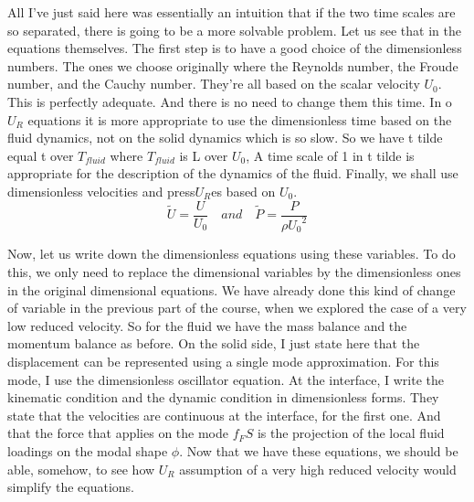 \documentclass{article}
\begin{document}
All I've just said here was essentially
an intuition that if the two time scales are so separated, there is
going to be a more solvable problem. Let us see that in
the equations themselves. The first step is to have a good
choice of the dimensionless numbers. The ones we choose originally
where the Reynolds number, the Froude number, and the Cauchy number. They're all based on
the scalar velocity $U_0$. This is perfectly adequate. And there is no need
to change them this time. 
In o$U_R$ equations it is more appropriate
to use the dimensionless time based on the fluid dynamics, not on
the solid dynamics which is so slow. So we have t tilde equal t over $T_{fluid}$ where $T_{fluid}$ is L over $U_0$,
A time scale of 1 in t tilde is appropriate for the
description of the dynamics of the fluid. Finally, we shall use
dimensionless velocities and press$U_R$es based on $U_0$.  $$\tilde{U}=\frac{U}{U_0} \quad and  \quad  \tilde{P} = \frac{P}{
\rho {U_0}^2}$$ 

 Now, let us write down the dimensionless
equations using these variables. To do this, we only need to
replace the dimensional variables by the dimensionless ones in
the original dimensional equations. We have already done this kind of change
of variable in the previous part of the course, when we explored the case
of a very low reduced velocity. So for the fluid we have the mass balance
and the momentum balance as before. On the solid side,
I just state here that the displacement can be represented using
a single mode approximation. For this mode, I use the dimensionless
oscillator equation. At the interface,
I write the kinematic condition and the dynamic condition
in dimensionless forms. They state that the velocities
are continuous at the interface, for the first one. And that the force that applies
on the mode $f_ FS$ is the projection of the local
fluid loadings on the modal shape $\phi$. Now that we have these equations,
we should be able, somehow, to see how $U_R$ assumption of a very high reduced
velocity would simplify the equations. 
\end{document}
